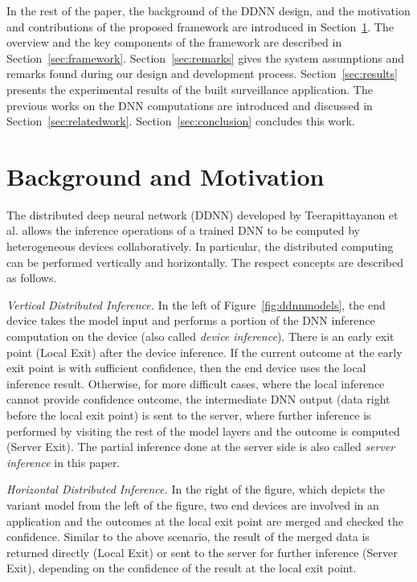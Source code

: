 \documentclass[format=acmsmall, review=false, screen=true]{acmart}
\def\figurename{Figure}
\def\sectionname{Section}
\begin{document}
In the rest of the paper, the background of the DDNN design, and the motivation and contributions of the proposed framework are introduced in \sectionname~\ref{sec:bk}. The overview and the key components of the framework are described in \sectionname~\ref{sec:framework}. \sectionname~\ref{sec:remarks} gives the system assumptions and remarks found during our design and development process. \sectionname~\ref{sec:results} presents the experimental results of the built surveillance application. The previous works on the DNN computations are introduced and discussed in \sectionname~\ref{sec:relatedwork}. \sectionname~\ref{sec:conclusion} concludes this work.

\section{Background and Motivation}
\label{sec:bk}
The distributed deep neural network (DDNN) developed by Teerapittayanon et al. \cite{Teerapittayanon17} allows the inference operations of a trained DNN to be computed by heterogeneous devices collaboratively. In particular, the distributed computing can be performed vertically and horizontally. The respect concepts are described as follows.

\emph{Vertical Distributed Inference.} In the left of \figurename~\ref{fig:ddnnmodels}, the end device takes the model input and performs a portion of the DNN inference computation on the device (also called \emph{device inference}). There is an early exit point (Local Exit) after the device inference. If the current outcome at the early exit point is with sufficient confidence, then the end device uses the local inference result. Otherwise, for more difficult cases, where the local inference cannot provide confidence outcome, the intermediate DNN output (data right before the local exit point) is sent to the server, where further inference is performed by visiting the rest of the model layers and the outcome is computed (Server Exit). The partial inference done at the server side is also called \emph{server inference} in this paper.

\emph{Horizontal Distributed Inference.} In the right of the figure, which depicts the variant model from the left of the figure, two end devices are involved in an application and the outcomes at the local exit point are merged and checked the confidence. Similar to the above scenario, the result of the merged data is returned directly (Local Exit) or sent to the server for further inference (Server Exit), depending on the confidence of the result at the local exit point.
\end{document}
